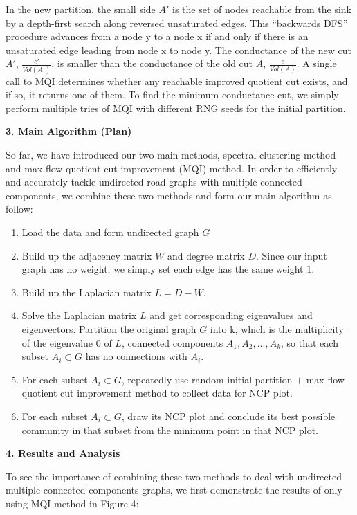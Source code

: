 \documentclass[12pt]{article}
\begin{document}
In the new partition, the small side $A'$ is the set of nodes reachable from the sink by a depth-first search along reversed unsaturated edges. This “backwards DFS” procedure advances from a node y to a node x if and only if there is an unsaturated edge leading from node x to node y. The conductance of the new cut $A'$, $\frac{c'}{Vol(A')}$, is smaller than the conductance of the old cut $A$, $\frac{c}{Vol(A)}$. A single call to MQI determines whether any reachable improved quotient cut exists, and if so, it returns one of them. To find the minimum conductance cut, we simply perform multiple tries of MQI with different RNG seeds for the initial partition. \\
\begin{center}
{\Large \textbf{3. Main Algorithm (Plan)}}
\end{center}
So far, we have introduced our two main methods, spectral clustering method and max flow quotient cut improvement (MQI) method. In order to efficiently and accurately tackle undirected road graphs with multiple connected components, we combine these two methods and form our main algorithm as follow:
\begin{enumerate}
\item Load the data and form undirected graph $G$
\item Build up the adjacency matrix $W$ and degree matrix $D$. Since our input graph has no weight, we simply set each edge has the same weight $1$.
\item Build up the Laplacian matrix $L=D-W$.
\item Solve the Laplacian matrix $L$ and get corresponding eigenvalues and eigenvectors. Partition the original graph $G$ into k, which is the multiplicity of the eigenvalue $0$ of $L$, connected components $A_{1},A_{2},...,A_{k}$, so that each subset $A_i \subset G$ has no connections with $\bar{A_i}$.
\item For each subset $A_i \subset G$, repeatedly use random initial partition $+$ max flow quotient cut improvement method to collect data for NCP plot.
\item For each subset $A_i \subset G$, draw its NCP plot and conclude its best possible community in that subset from the minimum point in that NCP plot. 
\end{enumerate}
\begin{center}
{\Large \textbf{4. Results and Analysis}}
\end{center}
To see the importance of combining these two methods to deal with undirected multiple connected components graphs, we first demonstrate the results of only using MQI method in Figure 4:
\end{document}
